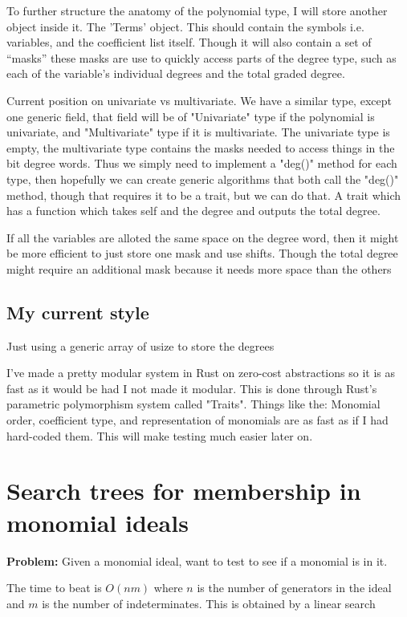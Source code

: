 To further structure the anatomy of the polynomial type, I will store another object inside it. The 'Terms' object. This should contain the symbols i.e. variables, and the coefficient list itself. Though it will also contain a set of ``masks'' these masks are use to quickly access parts of the degree type, such as each of the variable's individual degrees and the total graded degree.

Current position on univariate vs multivariate. We have a similar type, except one generic field, that field will be of "Univariate" type if the polynomial is univariate, and "Multivariate" type if it is multivariate. The univariate type is empty, the multivariate type contains the masks needed to access things in the bit degree words. Thus we simply need to implement a "deg()" method for each type, then hopefully we can create generic algorithms that both call the "deg()" method, though that requires it to be a trait, but we can do that. A trait which has a function which takes self and the degree and outputs the total degree.

If all the variables are alloted the same space on the degree word, then it might be more efficient to just store one mask and use shifts. Though the total degree might require an additional mask because it needs more space than the others

\subsection{My current style}%
\label{sub:My current style}

Just using a generic array of usize to store the degrees

I've made a pretty modular system in Rust on zero-cost abstractions so it is as fast as it would be had I not made it modular.
This is done through Rust's parametric polymorphism system called "Traits". Things like the: Monomial order, coefficient type, and representation of monomials are as fast as if I had hard-coded them. This will make testing much easier later on.

\section{Search trees for membership in monomial ideals}

\textbf{Problem:} Given a monomial ideal, want to test to see if a monomial is in it.

The time to beat is $O(nm)$ where $n$ is the number of generators in the ideal and $m$ is the number of indeterminates. This is obtained by a linear search


